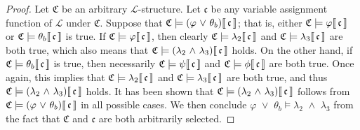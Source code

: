 \begin{proof}
    \vspace{0.3cm}
    \noindent
    Let \( \mathfrak{C} \) be an arbitrary \( \mathcal{L} \)-structure.
    Let \( \mathfrak{c} \) be any variable assignment function of \( \mathcal{L} \) under \( \mathfrak{C} \).
    Suppose that \( \folwffsatisfaction{\mathfrak{C}}{\mleft( \varphi \,\,{\lor}\,\, \theta_{b} \mright)}{\mathfrak{c}} \);
    that is, either \(  \mathfrak{C} \models \varphi\llbracket\, \mathfrak{c} \,\rrbracket \) or
    \(  \mathfrak{C} \models \theta_{b}\llbracket\, \mathfrak{c} \,\rrbracket \) is true.
    If \(  \mathfrak{C} \models \varphi\llbracket\, \mathfrak{c} \,\rrbracket \), then clearly \(  \mathfrak{C} \models \lambda_{2}\llbracket\, \mathfrak{c} \,\rrbracket \)
    and \(  \mathfrak{C} \models \lambda_{3}\llbracket\, \mathfrak{c} \,\rrbracket \) are both true, which also means that
    \( \folwffsatisfaction{\mathfrak{C}}{\mleft( \lambda_{2} \,\,{\land}\,\, \lambda_{3} \mright)}{\mathfrak{c}} \) holds.
    On the other hand, if \(  \mathfrak{C} \models \theta_{b}\llbracket\, \mathfrak{c} \,\rrbracket \) is true, then necessarily
    \(  \mathfrak{C} \models \psi\llbracket\, \mathfrak{c} \,\rrbracket \) and \(  \mathfrak{C} \models \phi\llbracket\, \mathfrak{c} \,\rrbracket \) are both true.
    Once again, this implies that \(  \mathfrak{C} \models \lambda_{2}\llbracket\, \mathfrak{c} \,\rrbracket \) and \(  \mathfrak{C} \models \lambda_{3}\llbracket\, \mathfrak{c} \,\rrbracket \)
    are both true, and thus \( \folwffsatisfaction{\mathfrak{C}}{\mleft( \lambda_{2} \,\,{\land}\,\, \lambda_{3} \mright)}{\mathfrak{c}} \) holds.
    It has been shown that \( \folwffsatisfaction{\mathfrak{C}}{\mleft( \lambda_{2} \,\,{\land}\,\, \lambda_{3} \mright)}{\mathfrak{c}} \)
    follows from \( \folwffsatisfaction{\mathfrak{C}}{\mleft( \varphi \,\,{\lor}\,\, \theta_{b} \mright)}{\mathfrak{c}} \) in all possible cases.
    We then conclude \( \varphi \,\,{\lor}\,\, \theta_{b} \models \lambda_{2} \,\,{\land}\,\, \lambda_{3} \) from the fact that \( \mathfrak{C} \)
    and \( \mathfrak{c} \) are both arbitrarily selected.


\end{proof}
